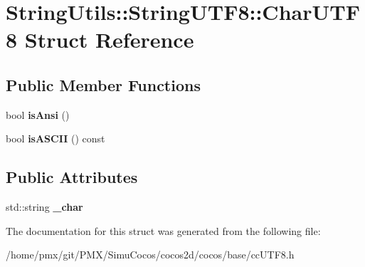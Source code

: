 \hypertarget{structStringUtils_1_1StringUTF8_1_1CharUTF8}{}\section{String\+Utils\+:\+:String\+U\+T\+F8\+:\+:Char\+U\+T\+F8 Struct Reference}
\label{structStringUtils_1_1StringUTF8_1_1CharUTF8}
\subsection*{Public Member Functions}
\begin{DoxyCompactItemize}
\item 
\mbox{\label{structStringUtils_1_1StringUTF8_1_1CharUTF8_aa3a65b26461f486c1b5e3b85d209ae55}} 
bool {\bfseries is\+Ansi} ()
\item 
\mbox{\label{structStringUtils_1_1StringUTF8_1_1CharUTF8_a0bd4f15a986721dc4d2133f0e9182663}} 
bool {\bfseries is\+A\+S\+C\+II} () const
\end{DoxyCompactItemize}
\subsection*{Public Attributes}
\begin{DoxyCompactItemize}
\item 
\mbox{\label{structStringUtils_1_1StringUTF8_1_1CharUTF8_ac920a028ee6dfe669cd8c977504ed5a2}} 
std\+::string {\bfseries \+\_\+char}
\end{DoxyCompactItemize}


The documentation for this struct was generated from the following file\+:\begin{DoxyCompactItemize}
\item 
/home/pmx/git/\+P\+M\+X/\+Simu\+Cocos/cocos2d/cocos/base/cc\+U\+T\+F8.\+h\end{DoxyCompactItemize}
